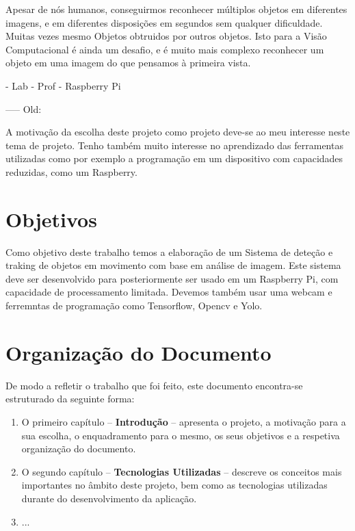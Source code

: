 Apesar de nós humanos, conseguirmos reconhecer múltiplos objetos em diferentes imagens, e em diferentes disposições em segundos sem qualquer dificuldade. Muitas vezes mesmo Objetos obtruidos por outros objetos. Isto para a Visão Computacional é ainda um desafio, e é muito mais complexo reconhecer um objeto em uma imagem do que pensamos à primeira vista.

- Lab 
- Prof
- Raspberry Pi

----- Old:

A motivação da escolha deste projeto como projeto deve-se ao meu interesse neste tema de projeto. Tenho também muito interesse no aprendizado das ferramentas utilizadas como por exemplo a programação em um dispositivo com capacidades reduzidas, como um \ac{Raspberry}.


\section{Objetivos}
\label{sec:obj}

Como objetivo deste trabalho temos a elaboração de um Sistema de deteção e traking de objetos em movimento com base em análise de imagem. Este sistema deve ser desenvolvido para posteriormente ser usado em um Raspberry Pi, com capacidade de processamento limitada. Devemos também usar uma webcam e ferremntas de programação como Tensorflow, Opencv e Yolo.

\section{Organização do Documento}
\label{sec:organ}
De modo a refletir o trabalho que foi feito, este documento encontra-se estruturado da seguinte forma:
\begin{enumerate}
\item O primeiro capítulo -- \textbf{Introdução} -- apresenta o projeto, a motivação para a sua escolha, o enquadramento para o mesmo, os seus objetivos e a respetiva organização do documento.
\item O segundo capítulo -- \textbf{Tecnologias Utilizadas} -- descreve os conceitos mais importantes no âmbito deste projeto, bem como as tecnologias utilizadas durante do desenvolvimento da aplicação.
\item ...
\end{enumerate}

% 
